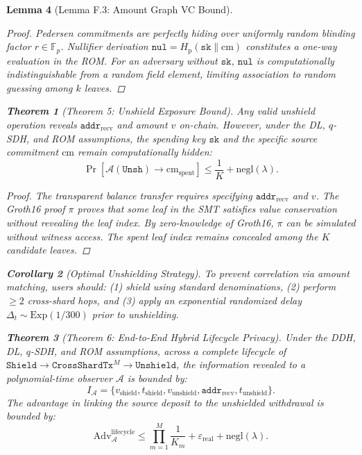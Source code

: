\documentclass[journal,10pt,twocolumn]{IEEEtran}
\newtheorem{theorem}{Theorem}
\newtheorem{lemma}[theorem]{Lemma}
\newtheorem{corollary}[theorem]{Corollary}
\theoremstyle{definition}
\theoremstyle{remark}
\begin{document}
\begin{lemma}[Lemma F.3: Amount Graph VC Bound]
\begin{proof}
Pedersen commitments are perfectly hiding over uniformly random blinding factor $r \in \mathbb{F}_p$. Nullifier derivation $\mathtt{nul} = H_{\text{p}}(\mathtt{sk} \parallel \text{cm})$ constitutes a one-way evaluation in the ROM. For an adversary without $\mathtt{sk}$, $\mathtt{nul}$ is computationally indistinguishable from a random field element, limiting association to random guessing among $k$ leaves.
\end{proof}

\begin{theorem}[Theorem 5: Unshield Exposure Bound]
Any valid unshield operation reveals $\mathtt{addr}_{\text{recv}}$ and amount $v$ on-chain. However, under the DL, $q$-SDH, and ROM assumptions, the spending key $\mathtt{sk}$ and the specific source commitment $\text{cm}$ remain computationally hidden:
\begin{equation}
\Pr[\mathcal{A}(\mathtt{Unsh}) \to \text{cm}_{\text{spent}}] \le \frac{1}{K} + \text{negl}(\lambda).
\end{equation}
\end{theorem}

\begin{proof}
The transparent balance transfer requires specifying $\mathtt{addr}_{\text{recv}}$ and $v$. The Groth16 proof $\pi$ proves that some leaf in the SMT satisfies value conservation without revealing the leaf index. By zero-knowledge of Groth16, $\pi$ can be simulated without witness access. The spent leaf index remains concealed among the $K$ candidate leaves.
\end{proof}

\begin{corollary}[Optimal Unshielding Strategy]
To prevent correlation via amount matching, users should: (1) shield using standard denominations, (2) perform $\ge 2$ cross-shard hops, and (3) apply an exponential randomized delay $\Delta_t \sim \text{Exp}(1/300)$ prior to unshielding.
\end{corollary}

\begin{theorem}[Theorem 6: End-to-End Hybrid Lifecycle Privacy]
Under the DDH, DL, $q$-SDH, and ROM assumptions, across a complete lifecycle of $\mathtt{Shield} \to \mathtt{CrossShardTx}^M \to \mathtt{Unshield}$, the information revealed to a polynomial-time observer $\mathcal{A}$ is bounded by:
\begin{equation}
I_{\mathcal{A}} = \{ v_{\text{shield}}, t_{\text{shield}}, v_{\text{unshield}}, \mathtt{addr}_{\text{recv}}, t_{\text{unshield}} \}.
\end{equation}
The advantage in linking the source deposit to the unshielded withdrawal is bounded by:
\begin{equation}
\text{Adv}^{\text{lifecycle}}_{\mathcal{A}} \le \prod_{m=1}^M \frac{1}{K_m} + \varepsilon_{\text{real}} + \text{negl}(\lambda).
\end{equation}
\end{theorem}


\end{lemma}
\end{document}
